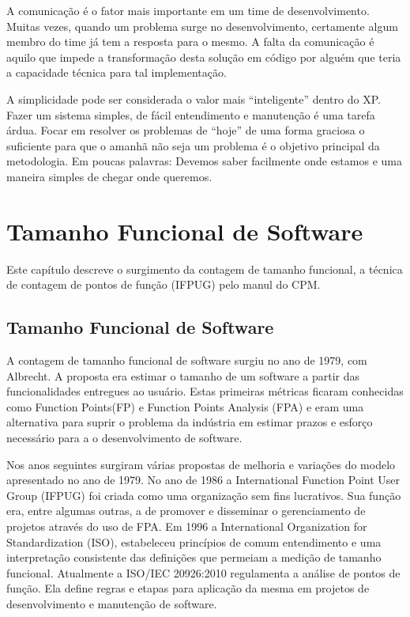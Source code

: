 A comunicação é o fator mais importante em um time de desenvolvimento. Muitas vezes, quando um problema surge no desenvolvimento, certamente algum membro do time já tem a resposta para o mesmo. A falta da comunicação é aquilo que impede a transformação desta solução em código por alguém que teria a capacidade técnica para tal implementação.

A simplicidade pode ser considerada o valor mais “inteligente” dentro do XP. Fazer um sistema simples, de fácil entendimento e manutenção é uma tarefa árdua. Focar em resolver os problemas de “hoje” de uma forma graciosa o suficiente para que o amanhã
não seja um problema é o objetivo principal da metodologia. Em poucas palavras: Devemos saber facilmente onde estamos e uma maneira simples de chegar onde queremos.


\chapter[Tamanho Funcional de Software]{Tamanho Funcional de Software}

Este capítulo descreve o surgimento da contagem de tamanho funcional, a técnica de contagem de pontos de função (IFPUG) pelo manul do CPM.

\section{Tamanho Funcional de Software}

A contagem de tamanho funcional de software surgiu no ano de 1979, com Albrecht. A proposta era estimar o tamanho de um software a partir das funcionalidades entregues ao usuário. Estas primeiras métricas ficaram conhecidas como Function Points(FP)  e  Function Points Analysis (FPA)  e eram uma alternativa para suprir o problema da indústria em estimar prazos e esforço necessário para a o desenvolvimento de software.

Nos anos seguintes surgiram várias propostas de melhoria e variações do modelo apresentado no ano de 1979. No ano de 1986 a International Function Point User Group (IFPUG) foi criada como uma organização sem fins lucrativos. Sua função era, entre algumas outras, a de promover e disseminar o gerenciamento de projetos através do uso de FPA. Em 1996 a International Organization for Standardization (ISO), estabeleceu princípios de comum entendimento e uma interpretação consistente das  definições que permeiam a medição de tamanho funcional. Atualmente a ISO/IEC 20926:2010 regulamenta a análise de pontos de função. Ela define regras e etapas para aplicação da mesma em projetos de desenvolvimento e manutenção de software.

